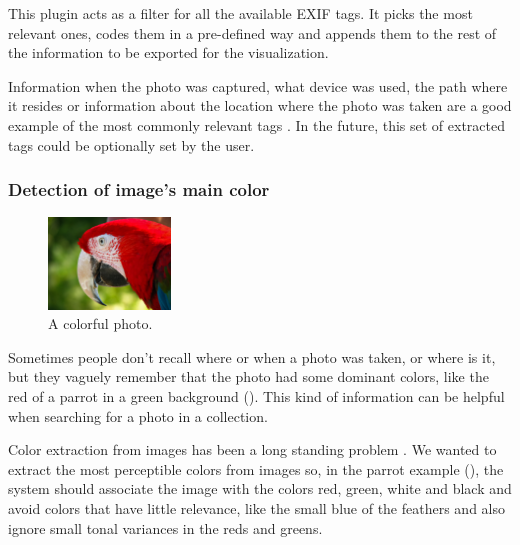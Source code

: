 This plugin acts as a filter for all the available \ac{EXIF} tags. It picks the most relevant ones, codes them in a pre-defined way and appends them to the rest of the information to be exported for the visualization.

Information when the photo was captured, what device was used, the path where it resides or information about the location where the photo was taken are a good example of the most commonly relevant tags . In the future, this set of extracted tags could be optionally set by the user.


\subsubsection{Detection of image’s main color}

\begin{figure}
	\vspace{-20pt}
	\begin{center}
		\includegraphics[width=0.29\textwidth]{Figures/parrot}
	\end{center}
	\vspace{-20pt}
	\caption{A colorful photo.}
	\vspace{-5pt}
	\label{fig:parrot}
\end{figure}

Sometimes people don’t recall where or when a photo was taken, or where is it, but they vaguely remember that the photo had some dominant colors, like the red of a parrot in a green background (). This kind of information can be helpful when searching for a photo in a collection.

Color extraction from images has been a long standing problem \cite{Wan:2011bg,Strong:2009p413,Gabbouj:2009en,Girgensohn:2009:MOP:1502650.1502711,Zaheer:2010p3735,Datta:2008p1604,Chang:2007bt}. We wanted to extract the most perceptible colors from images so, in the parrot example (), the system should associate the image with the colors red, green, white and black and avoid colors that have little relevance, like the small blue of  the feathers and also ignore small tonal variances in the reds and greens.

